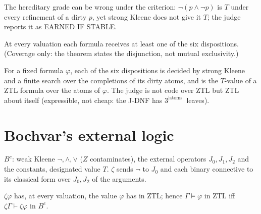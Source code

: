 \begin{theorem}\label{thm:canerr}
  \leanok
  The hereditary grade can be wrong under the criterion: $\neg(p\wedge\neg p)$
  is $T$ under every refinement of a dirty $p$, yet strong Kleene does not
  give it $T$; the judge reports it as EARNED IF STABLE.
\end{theorem}

\begin{theorem}\label{thm:partition}
  \leanok
  At every valuation each formula receives at least one of the six
  dispositions. (Coverage only: the theorem states the disjunction, not
  mutual exclusivity.)
\end{theorem}

\begin{theorem}\label{thm:speaks}
  \leanok
  For a fixed formula $\varphi$, each of the six dispositions is decided by
  strong Kleene and a finite search over the completions of its dirty atoms,
  and is the $T$-value of a ZTL formula over the atoms of $\varphi$. The
  judge is not code over ZTL but ZTL about itself (expressible, not cheap: the
  J-DNF has $3^{|\mathrm{atoms}|}$ leaves).
\end{theorem}

\chapter{Bochvar's external logic}

\begin{definition}\label{def:bochvar}
  \leanok
  $B^e$: weak Kleene $\neg,\wedge,\vee$ ($Z$ contaminates), the external
  operators $J_0,J_1,J_2$ and the constants, designated value $T$. $\zeta$
  sends $\neg$ to $J_0$ and each binary connective to its classical form
  over $J_0,J_2$ of the arguments.
\end{definition}

\begin{theorem}\label{thm:zeta}
  \leanok
  $\zeta\varphi$ has, at every valuation, the value $\varphi$ has in ZTL;
  hence $\Gamma\vDash\varphi$ in ZTL iff $\zeta\Gamma\vdash\zeta\varphi$ in
  $B^e$.
\end{theorem}

